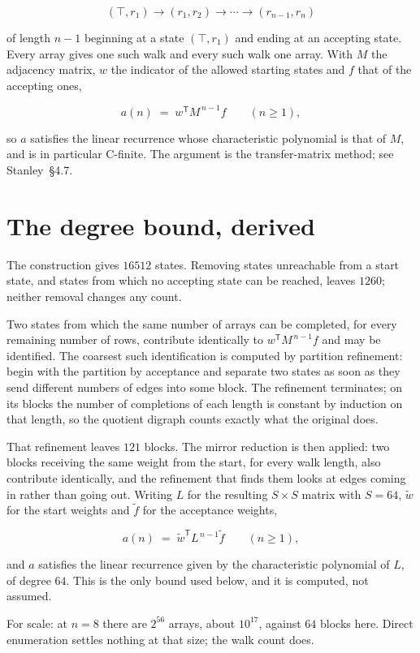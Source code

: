 \documentclass[11pt]{article}
\theoremstyle{definition}
\begin{document}
\[(\top,r_1) \to (r_1,r_2) \to \cdots \to (r_{n-1},r_n)\]

of length $n-1$ beginning at a state $(\top,r_1)$ and ending at an accepting state. Every array gives one such walk and every such walk one array. With $M$ the adjacency matrix, $w$ the indicator of the allowed starting states and $f$ that of the accepting ones,

\[a(n) \;=\; w^{\mathsf T} M^{\,n-1} f \qquad (n \ge 1),\]

so $a$ satisfies the linear recurrence whose characteristic polynomial is that of $M$, and is in particular C-finite. The argument is the transfer-matrix method; see Stanley~\S4.7.

\section{The degree bound, derived}

The construction gives $16512$ states. Removing states unreachable from a start state, and states from which no accepting state can be reached, leaves $1260$; neither removal changes any count.

Two states from which the same number of arrays can be completed, for every remaining number of rows, contribute identically to $w^{\mathsf T}M^{\,n-1}f$ and may be identified. The coarsest such identification is computed by partition refinement: begin with the partition by acceptance and separate two states as soon as they send different numbers of edges into some block. The refinement terminates; on its blocks the number of completions of each length is constant by induction on that length, so the quotient digraph counts exactly what the original does.

That refinement leaves $121$ blocks. The mirror reduction is then applied: two blocks receiving the same weight from the start, for every walk length, also contribute identically, and the refinement that finds them looks at edges coming in rather than going out. Writing $L$ for the resulting $S \times S$ matrix with $S = 64$, $\tilde w$ for the start weights and $\tilde f$ for the acceptance weights,

\[a(n) \;=\; \tilde w^{\mathsf T} L^{\,n-1} \tilde f \qquad (n \ge 1),\]

and $a$ satisfies the linear recurrence given by the characteristic polynomial of $L$, of degree $64$. This is the only bound used below, and it is computed, not assumed.

For scale: at $n = 8$ there are $2^{56}$ arrays, about $10^{17}$, against $64$ blocks here. Direct enumeration settles nothing at that size; the walk count does.
\end{document}
